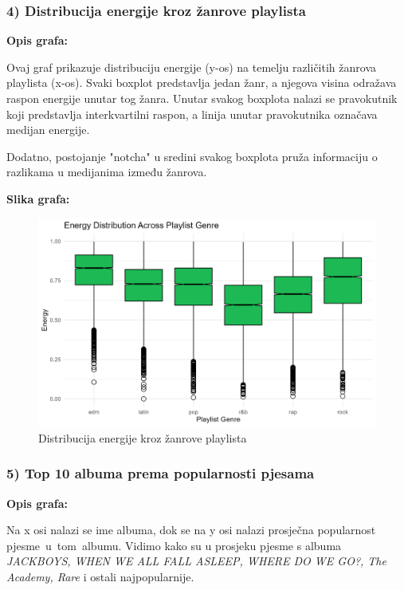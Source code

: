 		\subsubsection{4) Distribucija energije kroz žanrove playlista}
	
	\textbf{Opis grafa:}
	
	Ovaj graf prikazuje distribuciju energije (y-os) na temelju različitih žanrova playlista (x-os). Svaki boxplot predstavlja jedan žanr, a njegova visina odražava raspon energije unutar tog žanra. Unutar svakog boxplota nalazi se pravokutnik koji predstavlja interkvartilni raspon, a linija unutar pravokutnika označava medijan energije.
	
	Dodatno, postojanje "notcha" u sredini svakog boxplota pruža informaciju o razlikama u medijanima između žanrova.
	
		\textbf{Slika grafa:}
	\begin{figure}[H]
		\includegraphics[scale=0.9]{slike/Genre-Energy.png}
		\centering
		\caption{Distribucija energije kroz žanrove playlista}
		
	\end{figure}
	
	\subsubsection{5) Top 10 albuma prema popularnosti pjesama}
	
	\textbf{Opis grafa:}
	
	Na x osi nalazi se ime albuma, dok se na y osi nalazi prosječna popularnost pjesme u tom albumu. Vidimo kako su u prosjeku pjesme s albuma \textit{JACKBOYS, WHEN WE ALL FALL ASLEEP, WHERE DO WE GO?, The Academy, Rare} i ostali najpopularnije.
	
